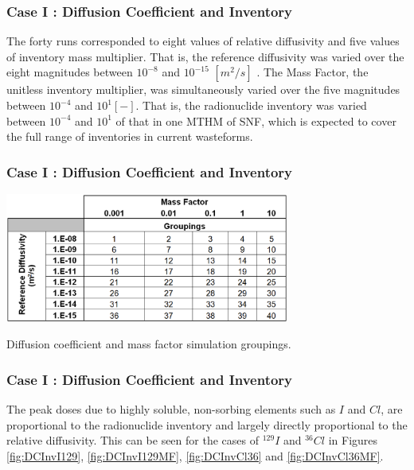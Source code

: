 \begin{frame}[c]
  \frametitle{Case I : Diffusion Coefficient and Inventory}
The forty runs corresponded to eight values of relative diffusivity and five 
values of inventory mass multiplier. That is, the reference diffusivity was varied over the 
eight magnitudes between $ 10^{-8}$ and $10^{-15}$ $[m^2 /s]$ . 
The Mass Factor, the unitless inventory multiplier, was simultaneously varied over 
the five magnitudes between $10^{-4}$ and $10^{1} [-]$. That is, the 
radionuclide inventory was varied between $10^{-4}$ and $10^{1}$ of that in one 
\gls{MTHM} of \gls{SNF}, which is expected to cover the full range of 
inventories in current wasteforms.
\end{frame}

\begin{frame}[c]
  \frametitle{Case I : Diffusion Coefficient and Inventory}
\begin{table}[hbp!]
\centering
\includegraphics[width=0.7\textwidth]{DiffCoeffAndInvEBSFail/DiffCoeffAndInvGroups.eps}
\caption{Diffusion coefficient and mass factor simulation groupings.}
\label{tab:DiffCoeffAndInvGroups}
\end{table}
\end{frame}

\begin{frame}[c]
  \frametitle{Case I : Diffusion Coefficient and Inventory}
The peak doses due to highly soluble, non-sorbing elements such as $I$ and $Cl$, 
are  proportional to the radionuclide inventory and 
largely directly proportional to the relative diffusivity. This can be seen for 
the cases of $^{129}I$ and $^{36}Cl$ in Figures \ref{fig:DCInvI129}, 
\ref{fig:DCInvI129MF}, \ref{fig:DCInvCl36} and \ref{fig:DCInvCl36MF}.
\end{frame}



